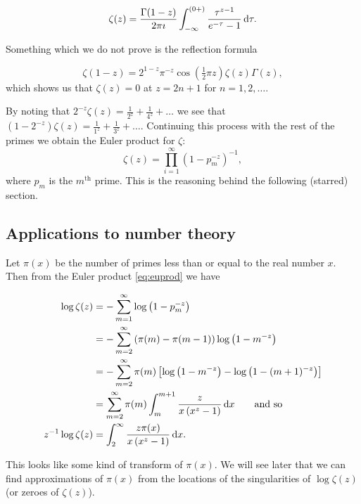\documentclass{notes}
\theoremstyle{plain}
\begin{document}
\begin{equation}\label{eq:zetacon}
\zeta(z) = \frac{\Gamma(1-z)}{2 \pi \imath} \int_{-\infty}^{(0+)}
\frac{\tau^{z-1}}{e^{-\tau}-1}\, \mathrm{d} \tau.
\end{equation}

Something which we do not prove is the reflection formula

\begin{equation}
\zeta(1-z) = 2^{1-z} \pi^{-z} \cos \left( \tfrac{1}{2} \pi z \right)
\zeta(z) \Gamma(z),
\end{equation}
which shows us that $\zeta(z) = 0$ at $z = 2 n + 1$ for $n=1, 2, \dots$.

By noting that $2^{-z} \zeta(z) = \frac{1}{2^z} + \frac{1}{4^z} + \dots$
we see that $(1-2^{-z}) \zeta(z) = \frac{1}{1^z} + \frac{1}{3^z} + \dots$.
Continuing this process with the rest of the primes we obtain the Euler
product for $\zeta$:
\begin{equation}\label{eq:euprod}
\zeta(z) = \prod_{i=1}^\infty \left(1-p_m^{-z} \right)^{-1},
\end{equation}
where $p_m$ is the $m^{\text{th}}$ prime.  This is the reasoning behind
the following (starred) section.

\subsection{Applications to number theory}

Let $\pi(x)$ be the number of primes less than or equal to the real number
$x$.  Then from the Euler product \eqref{eq:euprod} we have

\begin{align*}
\log \zeta(z) &= - \sum_{m=1}^\infty \log \left( 1 - p_m^{-z}\right) \\
& = - \sum_{m=2}^\infty \left(\pi(m) - \pi(m-1)
\right) \log \left( 1 - m^{-z}\right)\\
&= - \sum_{m=2}^\infty \pi(m) \left[ \log \left( 1-m^{-z} \right) -
\log \left( 1-(m+1)^{-z}\right) \right] \\
&= \sum_{m=2}^\infty \pi(m) \int_m^{m+1} \frac{z}{x \left( x^z - 1
\right)}\, \mathrm{d} x \qquad \text{and so}\\
z^{-1} \log \zeta(z) &= \int_2^\infty \frac{z \pi(x)}{x \left( x^z - 1
\right)}\, \mathrm{d} x.
\end{align*}

This looks like some kind of transform of $\pi(x)$.  We will see later
that we can find approximations of $\pi(x)$ from the locations of
the singularities of $\log \zeta(z)$ (or zeroes of $\zeta(z)$).
\end{document}
